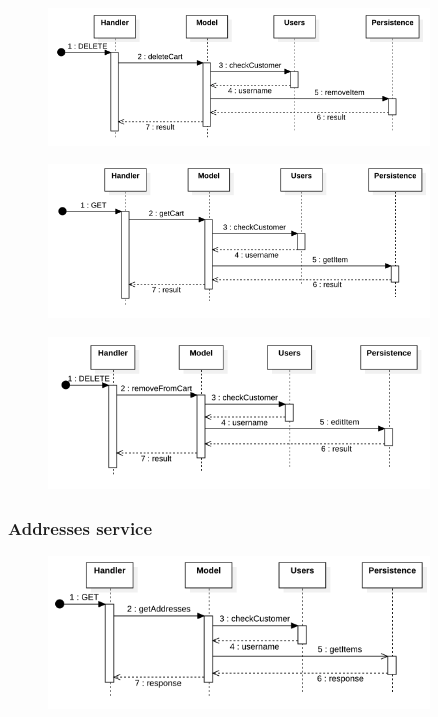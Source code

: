 \begin{figure}[H]
    \includegraphics[width=0.9\textwidth]{res/images/sequence-diagrams/carts/deleteCart.png}
\end{figure}

\begin{figure}[H]
    \includegraphics[width=0.9\textwidth]{res/images/sequence-diagrams/carts/getCart.png}
\end{figure}

\begin{figure}[H]
    \includegraphics[width=0.9\textwidth]{res/images/sequence-diagrams/carts/removeFromCart.png}
\end{figure}

\subsubsection{Addresses service}

\begin{figure}[H]
    \includegraphics[width=0.9\textwidth]{res/images/sequence-diagrams/addresses/getAddresses.png}
\end{figure}

